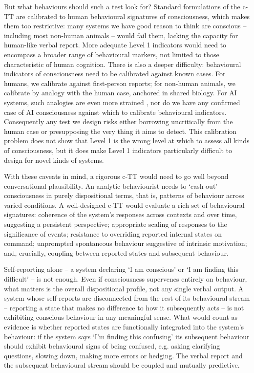 \documentclass[11pt, a4paper, onecolumn, gdm]{google}
\begin{document}
But what behaviours should such a test look for?
Standard formulations of the c-TT are calibrated to human behavioural signatures of consciousness, which makes them too restrictive: many systems we have good reason to think are conscious -- including most non-human animals -- would fail them, lacking the capacity for human-like verbal report.
More adequate Level 1 indicators would need to encompass a broader range of behavioural markers, not limited to those characteristic of human cognition.
There is also a deeper difficulty: behavioural indicators of consciousness need to be calibrated against known cases.
For humans, we calibrate against first-person reports; for non-human animals, we calibrate by analogy with the human case, anchored in shared biology.
For AI systems, such analogies are even more strained \citep[see][]{shevlin2021}, nor do we have any confirmed case of AI consciousness against which to calibrate behavioural indicators.
Consequently any test we design risks either borrowing uncritically from the human case or presupposing the very thing it aims to detect.
This calibration problem does not show that Level 1 is the wrong level at which to assess all kinds of consciousness, but it does make Level 1 indicators particularly difficult to design for novel kinds of systems.

With these caveats in mind, a rigorous c-TT would need to go well beyond conversational plausibility.
An analytic behaviourist needs to `cash out' consciousness in purely dispositional terms, that is, patterns of behaviour across varied conditions.
A well-designed c-TT would evaluate a rich set of behavioural signatures: coherence of the system's responses across contexts and over time, suggesting a persistent perspective; appropriate scaling of responses to the significance of events; resistance to overriding reported internal states on command; unprompted spontaneous behaviour suggestive of intrinsic motivation; and, crucially, coupling between reported states and subsequent behaviour.

Self-reporting alone -- a system declaring `I am conscious' or `I am finding this difficult' -- is not enough.
Even if consciousness supervenes entirely on behaviour, what matters is the overall dispositional profile, not any single verbal output.
A system whose self-reports are disconnected from the rest of its behavioural stream -- reporting a state that makes no difference to how it subsequently acts -- is not exhibiting conscious behaviour in any meaningful sense.
What would count as evidence is whether reported states are functionally integrated into the system's behaviour: if the system says `I'm finding this confusing' its subsequent behaviour should exhibit behavioural signs of being confused, e.g. asking clarifying questions, slowing down, making more errors or hedging.
The verbal report and the subsequent behavioural stream should be coupled and mutually predictive.
\end{document}
